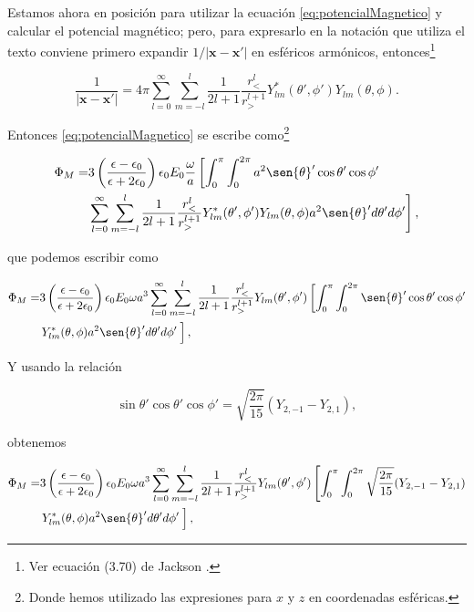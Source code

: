 \documentclass[a4paper,11pt]{article}
\numberwithin{equation}{section}
\newcommand{\zerodel}{.\kern-\nulldelimiterspace}
\begin{document}
Estamos ahora en posición para utilizar la ecuación \eqref{eq:potencialMagnetico} y 
calcular el potencial magnético; pero, para expresarlo en la notación que utiliza 
el texto conviene primero expandir $1/|\mathbf{x} - \mathbf{x}'|$ en esféricos 
armónicos, entonces\footnote{Ver ecuación (3.70) de Jackson \cite{jackson}.}

\begin{equation}
 \frac{1}{|\mathbf{x} - \mathbf{x}'|} = 4\pi \sum_{l=0}^\infty \sum_{m=-l}^l 
 \frac{1}{2l+1}\frac{r_<^l}{r_>^{l+1}}Y_{lm}^*(\theta',\phi')Y_{lm}(\theta,\phi).
\end{equation}

Entonces \eqref{eq:potencialMagnetico} se escribe como\footnote{Donde hemos utilizado 
las expresiones para $x$ y $z$ en coordenadas esféricas.}

\begin{align*}
 \Phi_M = &3\left(\frac{\epsilon - \epsilon_0}{\epsilon + 2\epsilon_0}
 \right)\epsilon_0E_0 \frac{\omega}{a}\left[ \int_0^{\pi}\int_0^{2\pi} a^2\sen{\theta}'
 \cos{\theta}'\cos{\phi}'\right\zerodel  \\
 &\left\zerodel\sum_{l=0}^\infty \sum_{m=-l}^l 
 \frac{1}{2l+1}\frac{r_<^l}{r_>^{l+1}}Y_{lm}^*(\theta',\phi')Y_{lm}(\theta,\phi)
 a^2\sen{\theta}'d\theta'd\phi'\right],
\end{align*}

que podemos escribir como 

\begin{align*}
 \Phi_M = &3\left(\frac{\epsilon - \epsilon_0}{\epsilon + 2\epsilon_0}
 \right)\epsilon_0E_0 \omega a^3 \sum_{l=0}^\infty \sum_{m=-l}^l 
 \frac{1}{2l+1}\frac{r_<^l}{r_>^{l+1}}Y_{lm}(\theta',\phi')\left[ \int_0^{\pi}\int_0^{2\pi} \sen{\theta}'
 \cos{\theta}'\cos{\phi}'\right\zerodel \\
 &\left\zerodel Y_{lm}^*(\theta,\phi)
 a^2\sen{\theta}'d\theta'd\phi' \frac{}{} \right],
\end{align*}

Y usando la relación 

\begin{equation}
 \sin{\theta}'\cos{\theta}'\cos{\phi}' = \sqrt{\frac{2\pi}{15}}(Y_{2,-1} - Y_{2,1}),
\end{equation}

obtenemos 

\begin{align*}
 \Phi_M = &3\left(\frac{\epsilon - \epsilon_0}{\epsilon + 2\epsilon_0}
 \right)\epsilon_0E_0 \omega a^3 \sum_{l=0}^\infty \sum_{m=-l}^l 
 \frac{1}{2l+1}\frac{r_<^l}{r_>^{l+1}}Y_{lm}(\theta',\phi')\left[ \int_0^{\pi}\int_0^{2\pi} 
 \sqrt{\frac{2\pi}{15}}(Y_{2,-1} - Y_{2,1})\right\zerodel \\
 &\left\zerodel Y_{lm}^*(\theta,\phi)
 a^2\sen{\theta}'d\theta'd\phi' \frac{}{} \right],
\end{align*}
\end{document}
